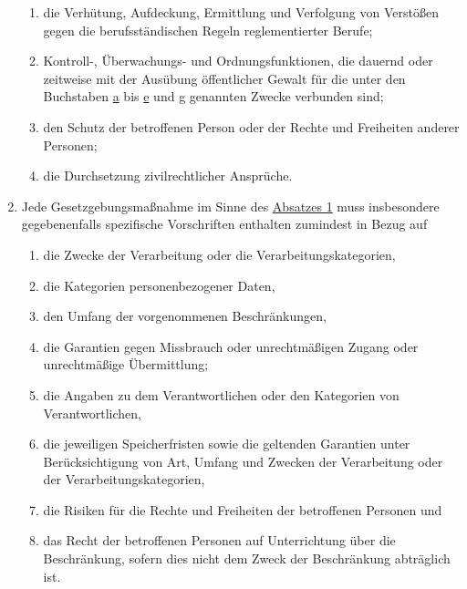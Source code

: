 \begin{enumerate}
\begin{enumerate}
    \item die Verhütung, Aufdeckung, Ermittlung und Verfolgung von Verstößen gegen die berufsständischen Regeln
     reglementierter Berufe;
    \label{itm:23-1g}

    \item Kontroll-, Überwachungs- und Ordnungsfunktionen, die dauernd oder zeitweise mit der Ausübung öffentlicher
     Gewalt für die unter den Buchstaben \hyperref[itm:23-1a]{a} bis \hyperref[itm:23-1e]{e} und \hyperref[itm:23-1g]
     {g} genannten Zwecke verbunden sind;
    \label{itm:23-1h}

    \item den Schutz der betroffenen Person oder der Rechte und Freiheiten anderer Personen;
    \label{itm:23-1i}

    \item die Durchsetzung zivilrechtlicher Ansprüche.
    \label{itm:23-1j}

  \end{enumerate}

  \item Jede Gesetzgebungsmaßnahme im Sinne des \hyperref[itm:23-1]{Absatzes 1} muss insbesondere gegebenenfalls
   spezifische Vorschriften enthalten zumindest in Bezug auf
  \label{itm:23-2}

  \begin{enumerate}
  
    \item die Zwecke der Verarbeitung oder die Verarbeitungskategorien,
    \label{itm:23-2a}

    \item die Kategorien personenbezogener Daten,
    \label{itm:23-2b}

    \item den Umfang der vorgenommenen Beschränkungen,
    \label{itm:23-2c}

    \item die Garantien gegen Missbrauch oder unrechtmäßigen Zugang oder unrechtmäßige Übermittlung;
    \label{itm:23-2d}

    \item die Angaben zu dem Verantwortlichen oder den Kategorien von Verantwortlichen,
    \label{itm:23-2e}

    \item die jeweiligen Speicherfristen sowie die geltenden Garantien unter Berücksichtigung von Art, Umfang und
     Zwecken der Verarbeitung oder der Verarbeitungskategorien,
    \label{itm:23-2f}

    \item die Risiken für die Rechte und Freiheiten der betroffenen Personen und
    \label{itm:23-2g}

    \item das Recht der betroffenen Personen auf Unterrichtung über die Beschränkung, sofern dies nicht dem Zweck der
     Beschränkung abträglich ist.
    \label{itm:23-2h}

  \end{enumerate}

\end{enumerate}


